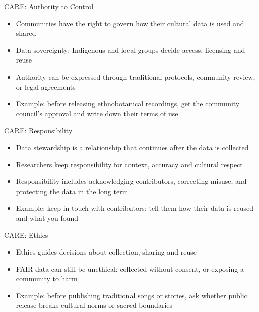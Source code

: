 \documentclass[aspectratio=169]{beamer}
\begin{document}
\begin{frame}{CARE: Authority to Control}
\begin{itemize}
  \item Communities have the right to govern how their cultural data is used and shared
  \item Data sovereignty: Indigenous and local groups decide access, licensing and reuse
  \item Authority can be expressed through traditional protocols, community review, or legal agreements
  \item Example: before releasing ethnobotanical recordings, get the community council's approval and write down their terms of use
\end{itemize}
\end{frame}

\begin{frame}{CARE: Responsibility}
\begin{itemize}
  \item Data stewardship is a relationship that continues after the data is collected
  \item Researchers keep responsibility for context, accuracy and cultural respect
  \item Responsibility includes acknowledging contributors, correcting misuse, and protecting the data in the long term
  \item Example: keep in touch with contributors; tell them how their data is reused and what you found
\end{itemize}
\end{frame}

\begin{frame}{CARE: Ethics}
\begin{itemize}
  \item Ethics guides decisions about collection, sharing and reuse
  \item FAIR data can still be unethical: collected without consent, or exposing a community to harm
  \item Example: before publishing traditional songs or stories, ask whether public release breaks cultural norms or sacred boundaries
\end{itemize}
\end{frame}
\end{document}
